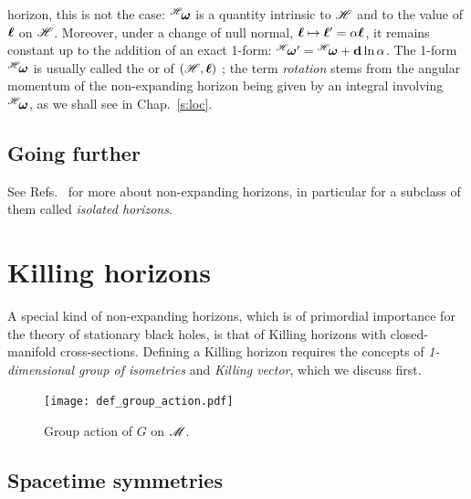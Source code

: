 horizon, this is not the case: ${}^{\mathscr{H}}\!\bm{\omega}$ is  a quantity intrinsic to $\mathscr{H}$ and to the value of $\bm{\ell}$ on $\mathscr{H}$.
Moreover, under a change of null normal, $\bm{\ell} \mapsto \bm{\ell}' = \alpha \bm{\ell}$,
it remains constant up to the addition of an exact 1-form:
${}^{\mathscr{H}}\!\bm{\omega}' = {}^{\mathscr{H}}\!\bm{\omega} + \mathbf{d}\ln\alpha$.
The 1-form ${}^{\mathscr{H}}\!\bm{\omega}$
is usually called the 
or 
of $(\mathscr{H}, \bm{\ell})$ \cite{AshteBL02,GourgJ06}; the term \emph{rotation}
stems from the angular momentum of the non-expanding horizon
being given by an integral involving ${}^{\mathscr{H}}\!\bm{\omega}$, as we shall see
in Chap.~\ref{s:loc}.

\subsection{Going further}

See Refs.~\cite{AshteK04,GourgJ06,Jaram13} for more
about non-expanding horizons, in particular for a subclass of them
called \emph{isolated horizons}.



\section{Killing horizons} \label{s:neh:Killing_hor}

A special kind of non-expanding horizons, which is of primordial
importance for the theory of
stationary black holes, is that of Killing horizons with closed-manifold cross-sections.
Defining a Killing horizon requires the concepts of \emph{1-dimensional group of
isometries} and \emph{Killing vector}, which we discuss first.

\begin{figure}
\centerline{\texttt{[image: def\_group\_action.pdf]}}
\caption[]{\label{f:neh:group_action} \footnotesize
Group action of $G$ on $\mathscr{M}$.}
\end{figure}


\subsection{Spacetime symmetries} \label{s:neh:symmetries}

